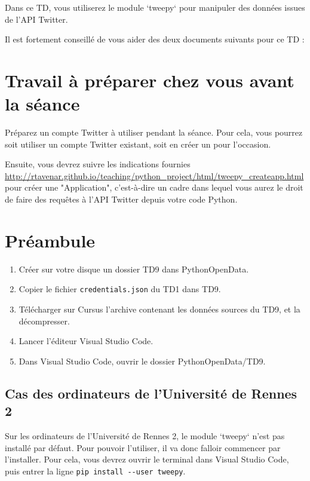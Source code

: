 \documentclass[11pt,a4paper]{article}
\begin{document}
Dans ce TD, vous utiliserez le module `tweepy` pour manipuler des données issues de l'API Twitter.

Il est fortement conseillé de vous aider des deux documents suivants pour ce TD :






\section*{Travail à préparer chez vous avant la séance}

Préparez un compte Twitter à utiliser pendant la séance. Pour cela, vous pourrez soit utiliser un compte Twitter existant, soit en créer un pour l'occasion. 

Ensuite, vous devrez suivre les indications fournies \url{http://rtavenar.github.io/teaching/python_project/html/tweepy_createapp.html} pour créer une "Application", c'est-à-dire un cadre dans lequel vous aurez le droit de faire des requêtes à l'API Twitter depuis votre code Python.


\section*{Préambule}
\begin{enumerate}
    \item Créer sur votre disque un dossier TD9 dans PythonOpenData. 
    \item Copier le fichier \verb+credentials.json+ du TD1 dans TD9.
    \item Télécharger sur Cursus l'archive contenant les données sources du TD9, et la décompresser.
    \item Lancer l'éditeur Visual Studio Code.
    \item Dans Visual Studio Code, ouvrir le dossier PythonOpenData/TD9. 
\end{enumerate}

\subsection*{Cas des ordinateurs de l'Université de Rennes 2}

Sur les ordinateurs de l'Université de Rennes 2, le module `tweepy` n'est pas installé par défaut. Pour pouvoir l'utiliser, il va donc falloir commencer par l'installer. Pour cela, vous devrez ouvrir le terminal dans Visual Studio Code, puis entrer la ligne \verb+pip install --user tweepy+.
\end{document}
